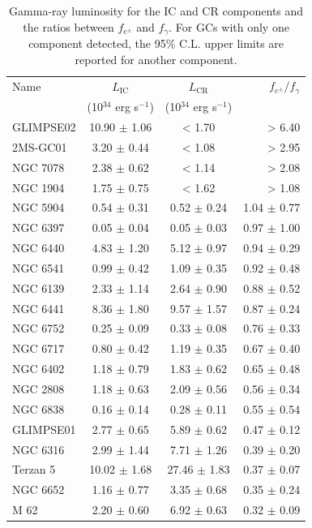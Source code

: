 \documentclass[doublespace,nopageskip]{VTthesis} %
\begin{document}
\begin{table}
    \centering
    \caption{Gamma-ray luminosity for the IC and CR  components and the ratios between $f_{e^\pm}$ and $f_\gamma$. For GCs with only one component detected, the 95\% C.L. upper limits are reported for another component.}
    \begin{tabular}{lccr}
\toprule
Name & $L_\mathrm{{IC}}$ & $L_\mathrm{CR}$ & $f_{e^\pm}/f_\gamma$ \\
 & (10$^{34}$ erg s$^{-1}$) & (10$^{34}$ erg s$^{-1}$) &  \\
\midrule
GLIMPSE02 & 10.90 $\pm$ 1.06 & < 1.70 & > 6.40 \\
2MS-GC01 & 3.20 $\pm$ 0.44 & < 1.08 & > 2.95 \\
NGC 7078 & 2.38 $\pm$ 0.62 & < 1.14 & > 2.08 \\
NGC 1904 & 1.75 $\pm$ 0.75 & < 1.62 & > 1.08 \\
NGC 5904 & 0.54 $\pm$ 0.31 & 0.52 $\pm$ 0.24 & 1.04 $\pm$ 0.77 \\
NGC 6397 & 0.05 $\pm$ 0.04 & 0.05 $\pm$ 0.03 & 0.97 $\pm$ 1.00 \\
NGC 6440 & 4.83 $\pm$ 1.20 & 5.12 $\pm$ 0.97 & 0.94 $\pm$ 0.29 \\
NGC 6541 & 0.99 $\pm$ 0.42 & 1.09 $\pm$ 0.35 & 0.92 $\pm$ 0.48 \\
NGC 6139 & 2.33 $\pm$ 1.14 & 2.64 $\pm$ 0.90 & 0.88 $\pm$ 0.52 \\
NGC 6441 & 8.36 $\pm$ 1.80 & 9.57 $\pm$ 1.57 & 0.87 $\pm$ 0.24 \\
NGC 6752 & 0.25 $\pm$ 0.09 & 0.33 $\pm$ 0.08 & 0.76 $\pm$ 0.33 \\
NGC 6717 & 0.80 $\pm$ 0.42 & 1.19 $\pm$ 0.35 & 0.67 $\pm$ 0.40 \\
NGC 6402 & 1.18 $\pm$ 0.79 & 1.83 $\pm$ 0.62 & 0.65 $\pm$ 0.48 \\
NGC 2808 & 1.18 $\pm$ 0.63 & 2.09 $\pm$ 0.56 & 0.56 $\pm$ 0.34 \\
NGC 6838 & 0.16 $\pm$ 0.14 & 0.28 $\pm$ 0.11 & 0.55 $\pm$ 0.54 \\
GLIMPSE01 & 2.77 $\pm$ 0.65 & 5.89 $\pm$ 0.62 & 0.47 $\pm$ 0.12 \\
NGC 6316 & 2.99 $\pm$ 1.44 & 7.71 $\pm$ 1.26 & 0.39 $\pm$ 0.20 \\
Terzan 5 & 10.02 $\pm$ 1.68 & 27.46 $\pm$ 1.83 & 0.37 $\pm$ 0.07 \\
NGC 6652 & 1.16 $\pm$ 0.77 & 3.35 $\pm$ 0.68 & 0.35 $\pm$ 0.24 \\
M 62 & 2.20 $\pm$ 0.60 & 6.92 $\pm$ 0.63 & 0.32 $\pm$ 0.09 \\

\end{tabular}
\end{table}
\end{document}
